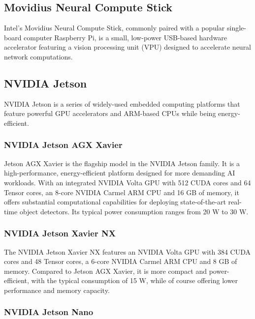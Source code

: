\subsection{Movidius Neural Compute Stick}

Intel's Movidius Neural Compute Stick, commonly paired with a popular
single-board computer Raspberry Pi, is a small, low-power USB-based hardware
accelerator featuring a vision processing unit (VPU) designed to accelerate
neural network computations.


\subsection{NVIDIA Jetson}
\label{Jetsons}

NVIDIA Jetson is a series of widely-used embedded computing platforms that
feature powerful GPU accelerators and ARM-based CPUs while being
energy-efficient.



\subsubsection{NVIDIA Jetson AGX Xavier}

Jetson AGX Xavier is the flagship model in the NVIDIA Jetson family. It is a
high-performance, energy-efficient platform designed for more demanding AI
workloads. With an integrated NVIDIA Volta GPU with 512 CUDA cores and 64 Tensor
cores, an 8-core NVIDIA Carmel ARM CPU and 16 GB of memory, it offers substantial
computational capabilities for deploying state-of-the-art real-time object
detectors. Its typical power consumption ranges from 20 W to 30 W.


\subsubsection{NVIDIA Jetson Xavier NX}

The NVIDIA Jetson Xavier NX features an NVIDIA Volta GPU with 384 CUDA cores and
48 Tensor cores, a 6-core NVIDIA Carmel ARM CPU and 8 GB of memory. Compared
to Jetson AGX Xavier, it is more compact and power-efficient, with the typical
consumption of 15 W, while of course offering lower performance and memory
capacity.


\subsubsection{NVIDIA Jetson Nano}

